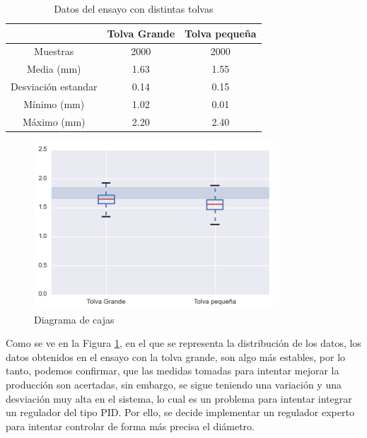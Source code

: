 \begin{table}[H]
    \centering
    \begin{tabular}{ccc}
                            & Tolva Grande & Tolva pequeña \\ \hline
        Muestras               & 2000  & 2000   \\
        Media (mm)          & 1.63     & 1.55      \\
        Desviación estandar & 0.14     & 0.15      \\
        Mínimo (mm)             & 1.02     & 0.01      \\
        Máximo (mm)             & 2.20     & 2.40     
    \end{tabular}
    \caption{Datos del ensayo con distintas tolvas}
    \label{tab:ensa_tolvas}
\end{table}

\begin{figure}[H]
    \centering
    \includegraphics[width=0.8\textwidth]{images/producciones/22072015/output_6_1.png}
    \caption{Diagrama de cajas }
    \label{fig:22072015-boxplot}
\end{figure}

Como se ve en la Figura \ref{fig:22072015-boxplot}, en el que se representa la distribución de los datos, los datos obtenidos en el ensayo con la tolva grande, son algo más estables, por lo tanto, podemos confirmar, que las medidas tomadas para intentar mejorar la producción son acertadas, sin embargo, se sigue teniendo una variación y una desviación muy alta en el sistema, lo cual es un problema para intentar integrar un regulador del tipo PID. Por ello, se decide implementar un regulador experto para intentar controlar de forma más precisa el diámetro.


